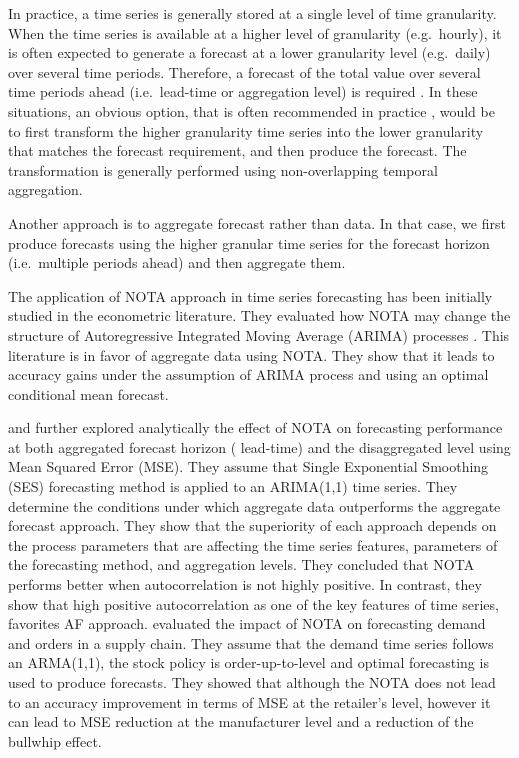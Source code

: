 \documentclass[preprint, 3p,
authoryear]{elsarticle} %
\begin{document}
In practice, a time series is generally stored at a single level of time
granularity. When the time series is available at a higher level of
granularity (e.g.~hourly), it is often expected to generate a forecast
at a lower granularity level (e.g.~daily) over several time periods.
Therefore, a forecast of the total value over several time periods ahead
(i.e.~lead-time or aggregation level) is required
\citep{mohammadipour2012forecast}. In these situations, an obvious
option, that is often recommended in practice \citep{goodwin2018profit},
would be to first transform the higher granularity time series into the
lower granularity that matches the forecast requirement, and then
produce the forecast. The transformation is generally performed using
non-overlapping temporal aggregation.

Another approach is to aggregate forecast rather than data. In that
case, we first produce forecasts using the higher granular time series
for the forecast horizon (i.e.~multiple periods ahead) and then
aggregate them.

The application of NOTA approach in time series forecasting has been
initially studied in the econometric literature. They evaluated how NOTA
may change the structure of Autoregressive Integrated Moving Average
(ARIMA) processes \citep{wei1978some, rossana1995temporal}. This
literature is in favor of aggregate data using NOTA. They show that it
leads to accuracy gains under the assumption of ARIMA process and using
an optimal conditional mean forecast.

\citet{rostami2013demand} and \citet{rostami2014note} further explored
analytically the effect of NOTA on forecasting performance at both
aggregated forecast horizon ( lead-time) and the disaggregated level
using Mean Squared Error (MSE). They assume that Single Exponential
Smoothing (SES) forecasting method is applied to an ARIMA(1,1) time
series. They determine the conditions under which aggregate data
outperforms the aggregate forecast approach. They show that the
superiority of each approach depends on the process parameters that are
affecting the time series features, parameters of the forecasting
method, and aggregation levels. They concluded that NOTA performs better
when autocorrelation is not highly positive. In contrast, they show that
high positive autocorrelation as one of the key features of time series,
favorites AF approach. \citet{rostami2019impact} evaluated the impact of
NOTA on forecasting demand and orders in a supply chain. They assume
that the demand time series follows an ARMA(1,1), the stock policy is
order-up-to-level and optimal forecasting is used to produce forecasts.
They showed that although the NOTA does not lead to an accuracy
improvement in terms of MSE at the retailer's level, however it can lead
to MSE reduction at the manufacturer level and a reduction of the
bullwhip effect.
\end{document}
